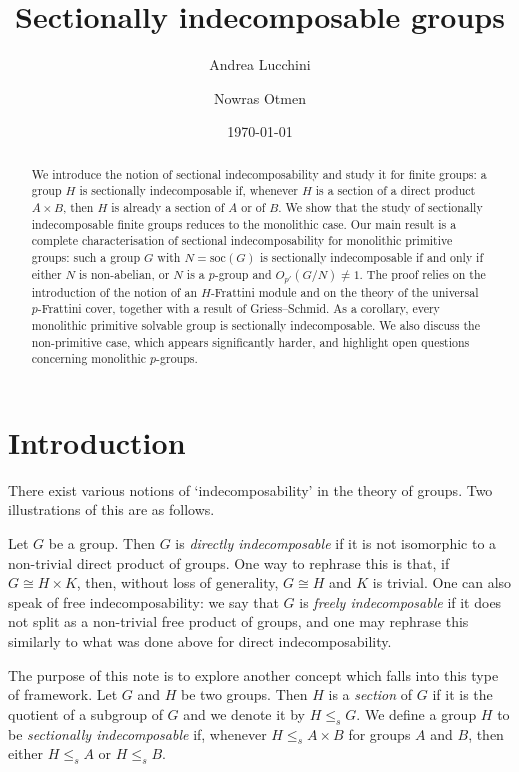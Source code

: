 \documentclass[a4paper,10pt]{amsart}
\title{Sectionally indecomposable groups}
\author{Andrea Lucchini}
\author{Nowras Otmen}
\date{\today}
\theoremstyle{plain}
\theoremstyle{definition}
\begin{document}
\maketitle

\begin{abstract}
We introduce the notion of sectional indecomposability and study it for finite groups: a group $H$ is sectionally indecomposable if, whenever $H$ is a section of a direct product $A \times B$, then $H$ is already a section of $A$ or of $B$. We show that the study of sectionally indecomposable finite groups reduces to the monolithic case. Our main result is a complete characterisation of sectional indecomposability for monolithic primitive groups: such a group $G$ with $N = \mathrm{soc}(G)$ is sectionally indecomposable if and only if either $N$ is non-abelian, or $N$ is a $p$-group and  $O_{p'}(G/N) \neq 1$. The proof relies on the introduction of the notion of an $H$-Frattini module and on the theory of the universal $p$-Frattini cover, together with a result of Griess--Schmid. As a corollary, every monolithic primitive solvable group is sectionally indecomposable. We also discuss the non-primitive case, which appears significantly harder, and highlight open questions concerning monolithic $p$-groups.
\end{abstract}

\section{Introduction}

There exist various notions of `indecomposability' in the theory of groups. Two illustrations of this are as follows. 

Let $G$ be a group. Then $G$ is \emph{directly indecomposable} if it is not isomorphic to a non-trivial direct product of groups. One way to rephrase this is that, if $G \cong H \times K$, then, without loss of generality, $G \cong H$ and $K$ is trivial. One can also speak of free indecomposability: we say that $G$ is \emph{freely indecomposable} if it does not split as a non-trivial free product of groups, and one may rephrase this similarly to what was done above for direct indecomposability.

The purpose of this note is to explore another concept which falls into this type of framework. Let $G$ and $H$ be two groups. Then $H$ is a \emph{section} of $G$ if it is the quotient of a subgroup of $G$ and we denote it by $H\leq_s G$. We define a group $H$ to be \emph{sectionally indecomposable} if, whenever $H \leq_s A \times B$ for groups $A$ and $B$, then either $H \leq_s A$ or $H \leq_s B$.
\end{document}
